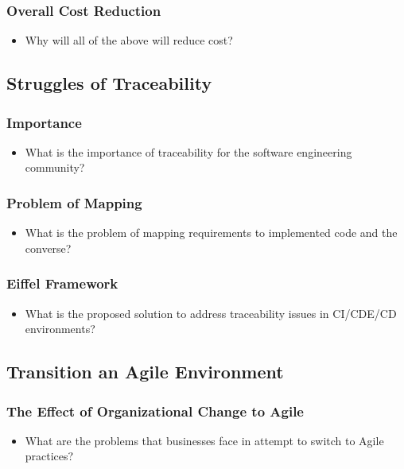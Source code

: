\documentclass[11pt,a4paper]{article}
\begin{document}
		\subsubsection{Overall Cost Reduction}
		\begin{itemize}[noitemsep]
			\item Why will all of the above will reduce cost?
		\end{itemize}
		
	\subsection{Struggles of Traceability}
		\subsubsection{Importance}
		\begin{itemize}[noitemsep]
			\item What is the importance of traceability for the software engineering community?
		\end{itemize}
		\subsubsection{Problem of Mapping}
		\begin{itemize}[noitemsep]
			\item What is the problem of mapping requirements to implemented code and the converse?
		\end{itemize}
		\subsubsection{Eiffel Framework}
		\begin{itemize}[noitemsep]
			\item What is the proposed solution to address traceability issues in CI/CDE/CD environments?
		\end{itemize}
		
	\subsection{Transition an Agile Environment}
		\subsubsection{The Effect of Organizational Change to Agile}
		\begin{itemize}[noitemsep]
			\item What are the problems that businesses face in attempt to switch to Agile practices?
		\end{itemize}
\end{document}
